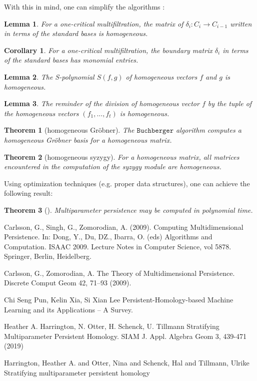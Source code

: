 \documentclass[a4paper,8pt,epsfig]{article}
\newtheorem{theorem}{Theorem}
\newtheorem{lemma}{Lemma}
\newtheorem{corollary}{Corollary}
\begin{document}
  	With this in mind, one can simplify the algorithms \cite{compmulpers}:
  	
 	\begin{lemma}
 		For a one-critical multifiltration, the matrix of $\delta_i: C_i \to C_{i-1}$ written in terms of the standard bases is homogeneous.
 	\end{lemma}
 	\begin{corollary}
 		For a one-critical multifiltration, the boundary matrix $\delta_i$ in terms of the standard bases has monomial entries.
 	\end{corollary}
 	\begin{lemma}
 		The S-polynomial $S(f,g)$ of homogeneous vectors $f$ and $g$ is homogeneous.
 	\end{lemma}
 	\begin{lemma}
 		The reminder of the division of homogeneous vector $f$ by the tuple of the homogeneous vectors $(f_1, ..., f_t)$ is homogeneous.
 	\end{lemma}
 	\begin{theorem}[homogeneous Gröbner]
 		The $\texttt{Buchberger}$ algorithm computes a homogeneous Gröbner basis for a homogeneous matrix.
 	\end{theorem}
  	\begin{theorem}[homogeneous syzygy]
  		For a homogeneous matrix, all matrices encountered in the computation of the syzygy module are homogeneous.
  	\end{theorem}
  
  	Using optimization techniques (e.g. proper data structures), one can achieve the following result:
  	\begin{theorem}[\cite{compmulpers}]
  		Multiparameter persistence may be computed in polynomial time.
  	\end{theorem}
	 
	 \begin{thebibliography}{5}
	 	 Carlsson, G., Singh, G., Zomorodian, A. (2009). Computing Multidimensional Persistence. In: Dong, Y., Du, DZ., Ibarra, O. (eds) Algorithms and Computation. ISAAC 2009. Lecture Notes in Computer Science, vol 5878. Springer, Berlin, Heidelberg.
	 	
	 	 Carlsson, G., Zomorodian, A. The Theory of Multidimensional Persistence. Discrete Comput Geom 42, 71–93 (2009).
	 	
	 	 Chi Seng Pun, Kelin Xia, Si Xian Lee Persistent-Homology-based Machine Learning and its Applications -- A Survey. 
	 	
	 	 Heather A. Harrington, N. Otter, H. Schenck, U. Tillmann Stratifying Multiparameter Persistent Homology. SIAM J. Appl. Algebra Geom 3, 439-471 (2019)
	 	
	 	  Harrington, Heather A. and Otter, Nina and Schenck, Hal and Tillmann, Ulrike Stratifying multiparameter persistent homology
	 	
	\end{thebibliography}
	 
\end{document}
